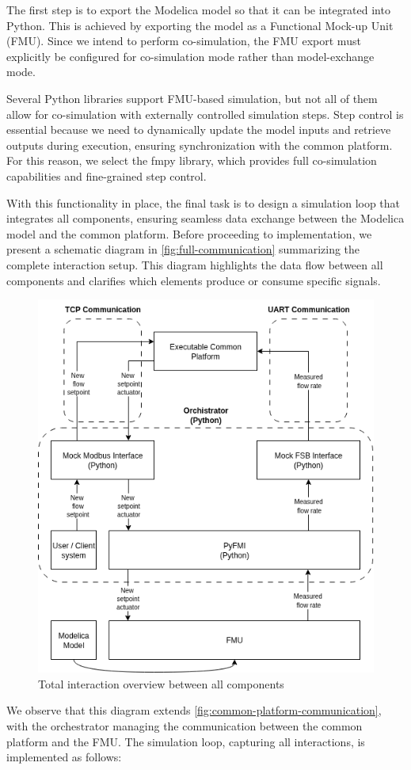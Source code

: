 \documentclass[we,final,11pt,oneside,openany]{uantwerpenbamathesis}
\begin{document}
The first step is to export the Modelica model so that it can be integrated into Python.
This is achieved by exporting the model as a Functional Mock-up Unit (FMU).
Since we intend to perform co-simulation, the FMU export must explicitly be configured for co-simulation mode rather than model-exchange mode.

Several Python libraries support FMU-based simulation, but not all of them allow for co-simulation with externally controlled simulation steps.
Step control is essential because we need to dynamically update the model inputs and retrieve outputs during execution, ensuring synchronization with the common platform.
For this reason, we select the fmpy library, which provides full co-simulation capabilities and fine-grained step control.

With this functionality in place, the final task is to design a simulation loop that integrates all components, ensuring seamless data exchange between the Modelica model and the common platform.
Before proceeding to implementation, we present a schematic diagram in \autoref{fig:full-communication} summarizing the complete interaction setup.
This diagram highlights the data flow between all components and clarifies which elements produce or consume specific signals.

\begin{figure}[h!]
    \centering
    \includegraphics[width=0.6\linewidth]{Images/generated/full-communication.drawio}
    \caption{Total interaction overview between all components}
    \label{fig:full-communication}
\end{figure}

We observe that this diagram extends \autoref{fig:common-platform-communication}, with the orchestrator managing the communication between the common platform and the FMU.
The simulation loop, capturing all interactions, is implemented as follows:
\end{document}
